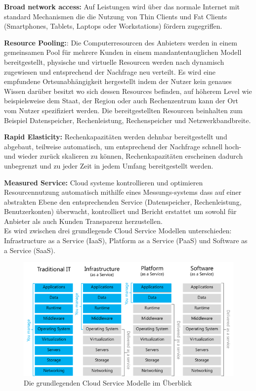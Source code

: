 \begin{spacing}{1.2}
\textbf{Broad network access:} Auf Leistungen wird über das normale Internet mit standard
Mechanismen die die Nutzung von Thin Clients und Fat Clients (Smartphones, Tablets,
Laptops oder Workstations) fördern zugegriffen.
 
\textbf{Resource Pooling:}: Die Computerresourcen des Anbieters werden in einem gemeinsamen Pool
für mehrere Kunden in einem mandantentauglichen Modell bereitgestellt, physische und
virtuelle Resourcen werden nach dynamisch zugewiesen und entsprechend der Nachfrage
neu verteilt. Es wird eine empfundene Ortsunabhängigkeit hergestellt indem der Nutzer
kein genaues Wissen darüber besitzt wo sich dessen Resources befinden, auf höherem
Level wie beispielsweise dem Staat, der Region oder auch Rechenzentrum kann
der Ort vom Nutzer spezifiziert werden. Die bereitgestellten Resourcen beinhalten
zum Beispiel Datenspeicher, Rechenleistung, Rechenspeicher und Netzwerkbandbreite.

\textbf{Rapid Elasticity:} Rechenkapazitäten werden dehnbar bereitgestellt und abgebaut,
teilweise automatisch, um entsprechend der Nachfrage schnell hoch- und wieder
zurück skalieren zu können, Rechenkapazitäten erscheinen dadurch unbegrenzt und
zu jeder Zeit in jedem Umfang bereitgestellt werden.

\textbf{Measured Service:} Cloud systeme kontrollieren und optimieren Resourcennutzung
automatisch mithilfe eines Messungs-systems dass auf einer abstrakten Ebene den
entsprechenden Service (Datenspeicher, Rechenleistung, Benutzerkonten) überwacht,
kontrolliert und Bericht erstattet um sowohl für Anbieter als auch Kunden Transparenz
herzustellen.\\

Es wird zwischen drei grundlegende Cloud Service Modellen unterschieden: Infrastructure
as a Service (IaaS), Platform as a Service (PaaS) und Software as a Service (SaaS).

\begin{figure}[H]
  \includegraphics[width=1.0\textwidth]{fig/hauptteil/Service-Models.png}
  \caption{Die grundlegenden Cloud Service Modelle im Überblick}
  \centering
\end{figure}


\end{spacing}

